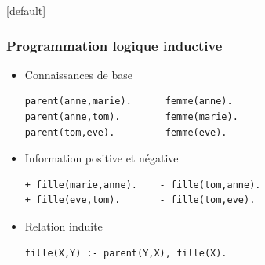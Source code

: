 \documentclass{beamer}             %
\makeatletter
\newenvironment{withoutheadline}{
        \setbeamertemplate{headline}[default]
        \def\beamer@entrycode{\vspace*{-\headheight}}
    }{}
\makeatother
\begin{document}
\begin{withoutheadline}
\begin{frame}[fragile]

\frametitle{Programmation logique inductive}

\begin{itemize}
 
\vfill
\pause
\item Connaissances de base

\begin{center}
\begin{minipage}{8.5cm}
\begin{block}{}
\begin{lstlisting}[basicstyle=\scriptsize]
parent(anne,marie).      femme(anne).
parent(anne,tom).        femme(marie).
parent(tom,eve).         femme(eve).
\end{lstlisting}
\end{block}
\end{minipage}
\end{center}

\vfill
\pause
\item Information positive et négative

\begin{center}
\begin{minipage}{8.5cm}
\begin{block}{}
\begin{lstlisting}[basicstyle=\scriptsize]
+ fille(marie,anne).    - fille(tom,anne).
+ fille(eve,tom).       - fille(tom,eve).
\end{lstlisting}
\end{block}
\end{minipage}
\end{center}

\vfill
\pause
\item Relation induite
\begin{center}
\begin{minipage}{8.5cm}
\begin{block}{}
\begin{lstlisting}[basicstyle=\scriptsize]
fille(X,Y) :- parent(Y,X), fille(X).
\end{lstlisting}
\end{block}
\end{minipage}
\end{center}

\vfill
\end{itemize}

\end{frame}
\end{withoutheadline}
\end{document}
